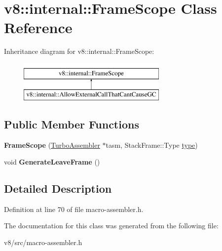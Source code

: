 \hypertarget{classv8_1_1internal_1_1FrameScope}{}\section{v8\+:\+:internal\+:\+:Frame\+Scope Class Reference}
\label{classv8_1_1internal_1_1FrameScope}
Inheritance diagram for v8\+:\+:internal\+:\+:Frame\+Scope\+:\begin{figure}[H]
\begin{center}
\leavevmode
\includegraphics[height=2.000000cm]{classv8_1_1internal_1_1FrameScope}
\end{center}
\end{figure}
\subsection*{Public Member Functions}
\begin{DoxyCompactItemize}
\item 
\mbox{\label{classv8_1_1internal_1_1FrameScope_aa317ab2fcc3f8e386f9225f7d8197deb}} 
{\bfseries Frame\+Scope} (\mbox{\hyperlink{classv8_1_1internal_1_1TurboAssembler}{Turbo\+Assembler}} $\ast$tasm, Stack\+Frame\+::\+Type \mbox{\hyperlink{classstd_1_1conditional_1_1type}{type}})
\item 
\mbox{\label{classv8_1_1internal_1_1FrameScope_a9f06dab495ac41ce64f39d55a79452d4}} 
void {\bfseries Generate\+Leave\+Frame} ()
\end{DoxyCompactItemize}


\subsection{Detailed Description}


Definition at line 70 of file macro-\/assembler.\+h.



The documentation for this class was generated from the following file\+:\begin{DoxyCompactItemize}
\item 
v8/src/macro-\/assembler.\+h\end{DoxyCompactItemize}
